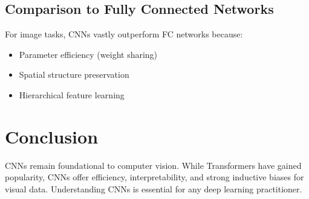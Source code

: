 \documentclass[12pt]{article}
\begin{document}
\subsection{Comparison to Fully Connected Networks}
For image tasks, CNNs vastly outperform FC networks because:
\begin{itemize}
    \item Parameter efficiency (weight sharing)
    \item Spatial structure preservation
    \item Hierarchical feature learning
\end{itemize}

\section{Conclusion}
CNNs remain foundational to computer vision. While Transformers have gained popularity, CNNs offer efficiency, interpretability, and strong inductive biases for visual data. Understanding CNNs is essential for any deep learning practitioner.
\end{document}
